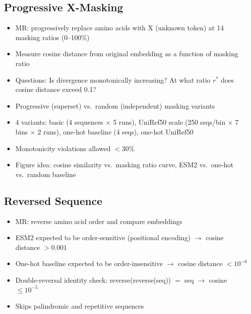 \subsection{Progressive X-Masking}\label{sec:exp-xmasking}
\begin{itemize}
  \item MR: progressively replace amino acids with X (unknown token) at 14 masking ratios (0--100\%)
  \item Measure cosine distance from original embedding as a function of masking ratio
  \item Questions: Is divergence monotonically increasing? At what ratio $r^*$ does cosine distance exceed 0.1?
  \item Progressive (superset) vs.\ random (independent) masking variants
  \item 4 variants: basic (4 sequences $\times$ 5 runs), UniRef50 scale (250 seqs/bin $\times$ 7 bins $\times$ 2 runs), one-hot baseline (4 seqs), one-hot UniRef50
  \item Monotonicity violations allowed $<30\%$
  \item Figure idea: cosine similarity vs.\ masking ratio curve, ESM2 vs.\ one-hot vs.\ random baseline
\end{itemize}

\subsection{Reversed Sequence}\label{sec:exp-reversal}
\begin{itemize}
  \item MR: reverse amino acid order and compare embeddings
  \item ESM2 expected to be order-sensitive (positional encoding) $\to$ cosine distance $> 0.001$
  \item One-hot baseline expected to be order-insensitive $\to$ cosine distance $< 10^{-6}$
  \item Double-reversal identity check: reverse(reverse(seq)) $=$ seq $\to$ cosine $\leq 10^{-5}$
  \item Skips palindromic and repetitive sequences
\end{itemize}

